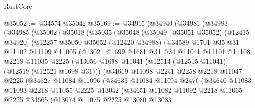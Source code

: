 \begin{lexlean}{RustCore}
\begin{coremodule}
@35052 := @34574 @35042
@35169 := @34915
    (@34940
      (@34981
        (@34983
          (@34985
            (@35002
              (@35018
                (@35035
                  (@35048
                    (@35049
                      (@35051 @35052)
                      (@12415 @34920)
                      (@12257
                        @35050
                        @35052
                        (@12420 @34988)
                        (@34589
                          @1701
                          @35
                          @31
                          @11102
                          @11109
                          @11005
                          (@13021
                            @1699
                            @1681
                            @31
                            @34
                            @11041
                            @11101
                            @11108
                            @2218
                            @11035
                            @2225
                            (@13056
                              @1698
                              @11041
                              (@12514 (@12515 @11041))
                              (@12519 (@12521 @1698 @31)))
                            (@34619
                              @11098
                              @2241
                              @2258
                              @2218
                              @11047
                              @2225
                              (@34627
                                @11084
                                @11096
                                (@34633
                                  @11084
                                  @11094
                                  @2476
                                  (@34640
                                    @11083
                                    @11093
                                    @2218
                                    @11055
                                    @2225
                                    @13042
                                    (@34651
                                      @11082
                                      @11092
                                      @2218
                                      @11065
                                      @2225
                                      @34665
                                      (@13074
                                        @11075
                                        @2225
                                        @13080
                                        @13083

\end{coremodule}
\end{lexlean}
